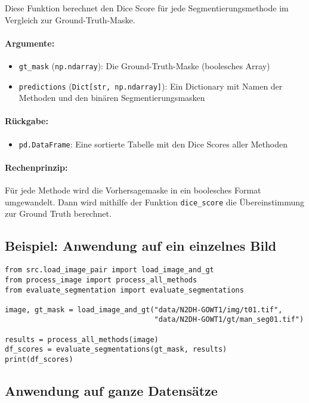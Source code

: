 \documentclass[a4paper,12pt]{article}
\begin{document}
Diese Funktion berechnet den Dice Score für jede Segmentierungsmethode im Vergleich zur Ground-Truth-Maske.

\paragraph{Argumente:}
\begin{itemize}
  \item \texttt{gt\_mask} (\texttt{np.ndarray}): Die Ground-Truth-Maske (boolesches Array)
  \item \texttt{predictions} (\texttt{Dict[str, np.ndarray]}): Ein Dictionary mit Namen der Methoden und den binären Segmentierungsmasken
\end{itemize}

\paragraph{Rückgabe:}
\begin{itemize}
  \item \texttt{pd.DataFrame}: Eine sortierte Tabelle mit den Dice Scores aller Methoden
\end{itemize}

\paragraph{Rechenprinzip:} Für jede Methode wird die Vorhersagemaske in ein boolesches Format umgewandelt. Dann wird mithilfe der Funktion \texttt{dice\_score} die Übereinstimmung zur Ground Truth berechnet.

\subsection*{ Beispiel: Anwendung auf ein einzelnes Bild}

\begin{verbatim}
from src.load_image_pair import load_image_and_gt
from process_image import process_all_methods
from evaluate_segmentation import evaluate_segmentations

image, gt_mask = load_image_and_gt("data/N2DH-GOWT1/img/t01.tif",
                                   "data/N2DH-GOWT1/gt/man_seg01.tif")

results = process_all_methods(image)
df_scores = evaluate_segmentations(gt_mask, results)
print(df_scores)
\end{verbatim}

\subsection*{ Anwendung auf ganze Datensätze}
\end{document}

